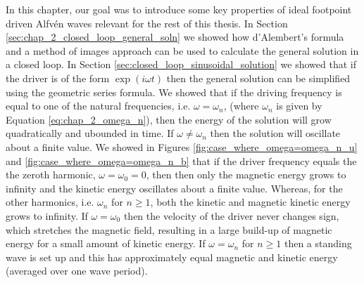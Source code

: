 In this chapter, our goal was to introduce some key properties of ideal footpoint driven Alfv\'en waves relevant for the rest of this thesis. In Section \ref{sec:chap_2_closed_loop_general_soln} we showed how d'Alembert's formula and a method of images approach can be used to calculate the general solution in a closed loop. In Section \ref{sec:closed_loop_sinusoidal_solution} we showed that if the driver is of the form $\exp(i\omega t)$ then the general solution can be simplified using the geometric series formula. We showed that if the driving frequency is equal to one of the natural frequencies, i.e. $\omega = \omega_n$, (where $\omega_n$ is given by Equation \ref{eq:chap_2_omega_n}), then the energy of the solution will grow quadratically and ubounded in time. If $\omega\ne\omega_n$ then the solution will oscillate about a finite value. We showed in Figures \ref{fig:case_where_omega=omega_n_u} and \ref{fig:case_where_omega=omega_n_b} that if the driver frequency equals the the zeroth harmonic, $\omega=\omega_0=0$, then then only the magnetic energy grows to infinity and the kinetic energy oscillates about a finite value. Whereas, for the other harmonics, i.e. $\omega_n$ for $n\ge1$, both the kinetic and magnetic kinetic energy grows to infinity. If $\omega=\omega_0$ then the velocity of the driver never changes sign, which stretches the magnetic field, resulting in a large build-up of magnetic energy for a small amount of kinetic energy. If $\omega=\omega_n$ for $n\ge 1$ then a standing wave is set up and this has approximately equal magnetic and kinetic energy (averaged over one wave period).

